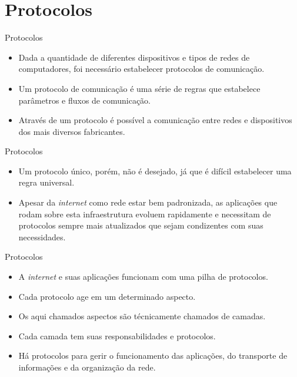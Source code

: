 \documentclass[11pt]{beamer}
\begin{document}
    \section{Protocolos}
    
    \begin{frame}{Protocolos}
      \begin{itemize}
        \item Dada a quantidade de diferentes dispositivos e tipos de redes de computadores, foi necessário estabelecer protocolos de comunicação.
        \item Um protocolo de comunicação é uma série de regras que estabelece parâmetros e fluxos de comunicação.
        \item Através de um protocolo é possível a comunicação entre redes e dispositivos dos mais diversos fabricantes. 
      \end{itemize}
    \end{frame}

    \begin{frame}{Protocolos}
      \begin{itemize}
        \item Um protocolo único, porém, não é desejado, já que é difícil estabelecer uma regra universal.
        \item Apesar da \textit{internet} como rede estar bem padronizada, as aplicações que rodam sobre esta infraestrutura evoluem rapidamente e necessitam de protocolos sempre mais atualizados que sejam condizentes com suas necessidades. 
      \end{itemize}
    \end{frame}

    \begin{frame}{Protocolos}
      \begin{itemize}
        \item A \textit{internet} e suas aplicações funcionam com uma pilha de protocolos.
        \item Cada protocolo age em um determinado aspecto.
        \item Os aqui chamados aspectos são técnicamente chamados de camadas.
        \item Cada camada tem suas responsabilidades e protocolos.
        \item Há protocolos para gerir o funcionamento das aplicações, do transporte de informações e da organização da rede.
      \end{itemize}
    \end{frame}
\end{document}
